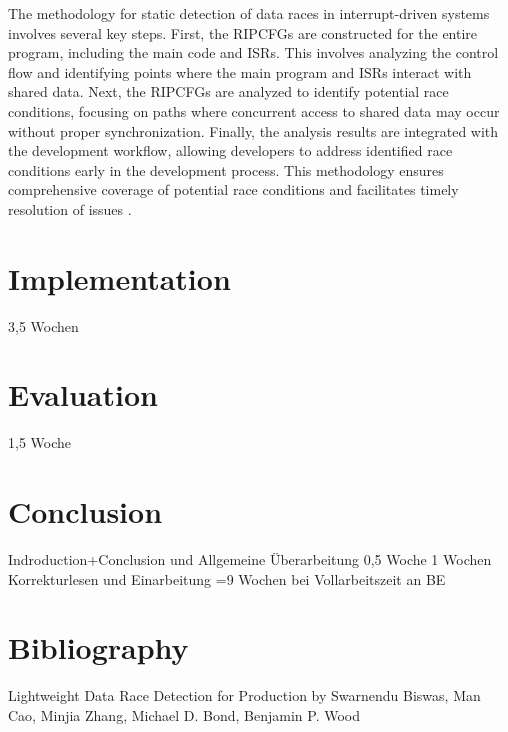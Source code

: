 \documentclass[
fancyheadings, %
%
%
]{stsreprt}
\begin{document}
{The methodology for static detection of data races in interrupt-driven systems involves several key steps. First, the RIPCFGs are constructed for the entire program, including the main code and ISRs. This involves analyzing the control flow and identifying points where the main program and ISRs interact with shared data. Next, the RIPCFGs are analyzed to identify potential race conditions, focusing on paths where concurrent access to shared data may occur without proper synchronization. Finally, the analysis results are integrated with the development workflow, allowing developers to address identified race conditions early in the development process. This methodology ensures comprehensive coverage of potential race conditions and facilitates timely resolution of issues \cite{wang2020}.





\chapter{Implementation}
3,5 Wochen
\chapter{Evaluation}
1,5 Woche 
\chapter{Conclusion}
Indroduction+Conclusion und Allgemeine Überarbeitung 0,5 Woche
1 Wochen Korrekturlesen und Einarbeitung
=9 Wochen bei Vollarbeitszeit an BE
\appendix
}
\backmatter{}
\chapter{Bibliography}
Lightweight Data Race Detection for Production by Swarnendu Biswas, Man Cao, Minjia Zhang, Michael D. Bond, Benjamin P. Wood
\end{document}
